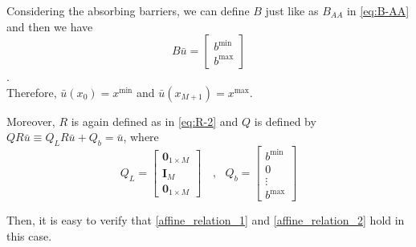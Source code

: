 \documentclass[11pt]{article}
\begin{document}
Considering the absorbing barriers, we can define $B$ just like as $B_{AA}$ in \eqref{eq:B-AA} and then we have
\begin{equation}
B\bar{u} = \begin{bmatrix}
b^{\min}\\
b^{\max}
\end{bmatrix}
\end{equation}.\\
Therefore, $\bar{u}(x_0) = x^{\min}$ and $\bar{u}(x_{M+1}) = x^{\max}$.

Moreover, $R$ is again defined as in \eqref{eq:R-2} and $Q$ is defined by $Q R\bar{u}\equiv Q_L R\bar{u}+Q_b = \bar{u}$, where
\begin{equation}
Q_L = \begin{bmatrix}
\mathbf{0}_{1\times M} \\
\mathbf{I}_M  \\
\mathbf{0}_{1\times M}
\end{bmatrix}%
\quad, \text{ } Q_b = \begin{bmatrix}
b^{\min}\\
0\\
\vdots\\
b^{\max}
\end{bmatrix}%
\end{equation}

Then, it is easy to verify that \eqref{affine_relation_1} and \eqref{affine_relation_2} hold in this case.
\end{document}

